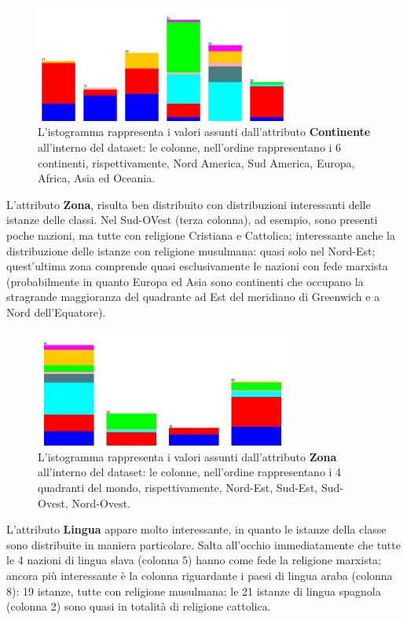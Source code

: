 \documentclass[a4paper,11pt,twoside,notitlepage,final]{scrartcl}
\begin{document}
\begin{figure}[H]
  \centering
  \includegraphics[width=0.75\textwidth]{fig/religion-landmass.jpg}%
  \caption{%
    L'istogramma rappresenta i valori assunti dall'attributo \textbf{Continente}
    all'interno del dataset: le colonne, nell'ordine rappresentano i 6 continenti, rispettivamente,
    Nord America, Sud America, Europa, Africa, Asia ed Oceania.
    }%
  \label{fig:landmass}
\end{figure}

L'attributo \textbf{Zona}, risulta ben distribuito con distribuzioni interessanti delle istanze delle classi.
Nel Sud-OVest (terza colonna), ad esempio, sono presenti poche nazioni, ma tutte con religione Cristiana e Cattolica;
interessante anche la distribuzione delle istanze con religione musulmana: quasi solo nel Nord-Est;
quest'ultima zona comprende quasi esclusivamente le nazioni con fede marxista (probabilmente in quanto Europa ed Asia sono continenti che occupano la stragrande maggioranza del quadrante ad Est del meridiano di Greenwich e a Nord dell'Equatore).

\begin{figure}[H]
  \centering
  \includegraphics[width=0.75\textwidth]{fig/religion-zone.jpg}%
  \caption{%
    L'istogramma rappresenta i valori assunti dall'attributo \textbf{Zona}
    all'interno del dataset: le colonne, nell'ordine rappresentano i 4 quadranti del mondo, rispettivamente,
    Nord-Est, Sud-Est, Sud-Ovest, Nord-Ovest.
    }%
  \label{fig:zone}
\end{figure}

L'attributo \textbf{Lingua} appare molto interessante, in quanto le istanze della classe sono distribuite in maniera particolare.
Salta all'occhio immediatamente che tutte le 4 nazioni di lingua slava (colonna 5) hanno come fede la religione marxista;
ancora più interessante è la colonna riguardante i paesi di lingua araba (colonna 8): 19 istanze, tutte con religione musulmana;
le 21 istanze di lingua spagnola (colonna 2) sono quasi in totalità di religione cattolica.
\end{document}
